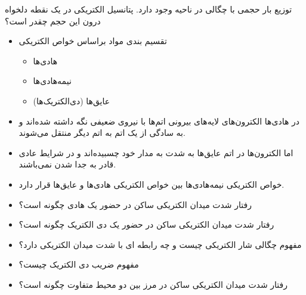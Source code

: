 
\begin{ELexample}{}

توزیع بار حجمی با چگالی  در ناحیه  وجود دارد. پتانسیل الکتریکی در یک نقطه دلخواه درون این حجم چقدر است؟


\begin{ELsolution}


\end{ELsolution}

\end{ELexample}

\ELhold


\begin{ELunit}


\begin{itemize}
\item
  تقسیم بندی مواد براساس خواص الکتریکی

  \begin{itemize}
  \tightlist
  \item
    هادی‌ها
  \item
    نیمه‌هادی‌ها
  \item
    عایق‌ها (دی‌الکتریک‌ها)
  \end{itemize}
\item
  در هادی‌ها الکترون‌های لایه‌های بیرونی اتم‌ها با نیروی ضعیفی نگه داشته شده‌اند و به سادگی از یک اتم به اتم دیگر منتقل می‌شوند.
\item
  اما الکترون‌ها در اتم عایق‌ها به شدت به مدار خود چسبیده‌اند و در شرایط عادی قادر به جدا شدن نمی‌باشند.
\item
  خواص الکتریکی نیمه‌هادی‌ها بین خواص الکتریکی هادی‌ها و عایق‌ها قرار دارد.
\item
  رفتار شدت میدان الکتریکی ساکن در حضور یک هادی چگونه است؟
\item
  رفتار شدت میدان الکتریکی ساکن در حضور یک دی الکتریک چگونه است؟
\item
  مفهوم چگالی شار الکتریکی چیست و چه رابطه ای با شدت میدان الکتریکی دارد؟
\item
  مفهوم ضریب دی الکتریک چیست؟
\item
  رفتار شدت میدان الکتریکی ساکن در مرز بین دو محیط متفاوت چگونه است؟
\end{itemize}

\end{ELunit}

